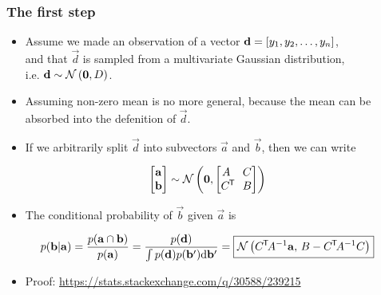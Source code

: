 \begin{frame} \frametitle{The first step}
\begin{itemize}
  \item Assume we made an observation of a vector
    $\vec{d} = [y_1,y_2,\mathellipsis,y_n]$,\\
    and that $\vec{d}$ is sampled from a multivariate Gaussian
    distribution,\\i.e. $\vec{d}\sim\N{\vec{0},D}$.
  \vspace{1mm}
  \item Assuming non-zero mean is no more general, because the mean can be
    absorbed into the defenition of $\vec{d}$.
  \vspace{1mm}
  \item If we arbitrarily split $\vec{d}$ into subvectors
    $\vec{a}$ and $\vec{b}$, then we can write
\end{itemize}
\begin{equation}\label{eq:n1}
  \begin{bmatrix} \vec{a} \\ \vec{b} \end{bmatrix} \sim
    \N{\vec{0},\begin{bmatrix} A & C \\ C\T\!\! & B \end{bmatrix}}
\end{equation}
\begin{itemize}
  \item The conditional probability of $\vec{b}$ given $\vec{a}$ is
\end{itemize}
\vspace{1mm}
\begin{equation}
  p(\vec{b}|\vec{a})
  = \frac{p(\vec{a}\cap\vec{b})}{p(\vec{a})}
  = \frac{p(\vec{d})}{\int p(\vec{d})p(\vec{b}') \mathrm{d}\vec{b}'}
  = \boxed{ \N{C\T\!A^{-1}\vec{a},\,B-C\T\!A^{-1}C} }
\end{equation}
\vspace{-5mm}
\begin{itemize}
  \item Proof: {\small\url{https://stats.stackexchange.com/q/30588/239215}}
\end{itemize}
\end{frame}

